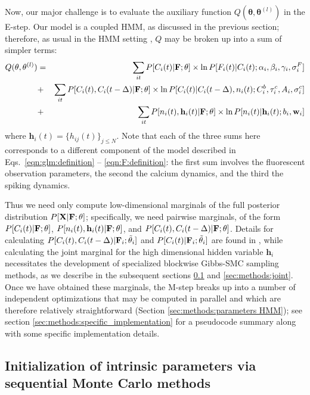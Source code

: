 \documentclass[aoas,preprint]{imsart}
\newcommand{\bth}{\mathbf{\theta}}
\newcommand{\w}{w}
\newcommand{\bw}{\mathbf{\w}}
\newcommand{\bF}{{\bf F}}
\newcommand{\bX}{{\bf X}}
\newcommand{\bh}{\mathbf{h}}
\newcommand{\tbth}{\tilde{\bth}}
\begin{document}
Now, our major challenge is to evaluate the auxiliary function $Q(\bth,\bth^{(l)})$ in the E-step. Our model is a coupled HMM, as discussed in the previous section; therefore, as usual in the HMM setting \cite{RAB89}, $Q$ may be broken up into a sum of simpler terms:
\begin{eqnarray}
Q(\bth,\bth^{(l)}) &=& \sum_{it} P[C_i(t) | \bF; \bth] \times \ln
P[F_i(t)|C_i(t); \alpha_i, \beta_i, \gamma_i, \sigma^F_i] \nonumber \\
&+& \sum_{it} P[C_i(t), C_i(t-\Delta) | \bF; \bth] \times \ln
P[C_i(t)|C_i(t-\Delta), n_i(t); C^b_i, \tau^c_i, A_i, \sigma^c_i]
\nonumber \\ &+& \sum_{it} P[n_i(t), \bh_i(t) | \bF; \bth] \times \ln
P[n_i(t)| \bh_i(t); b_i, \bw_i]
\label{eqn:loglik:definition-expl}
\end{eqnarray}
\noindent where $\bh_i(t)=\{h_{ij}(t)\}_{j \leq N}$. Note that each of
the three sums here corresponds to a different component of the model
described in Eqs.~\eqref{eqn:glm:definition} --
\eqref{eqn:F:definition}: the first sum involves the fluorescent
observation parameters, the second the calcium dynamics, and the third
the spiking dynamics.

Thus we need only compute low-dimensional marginals of the full
posterior distribution $P[\bX | \bF; \bth]$; specifically, we need
pairwise marginals, of the form $P[C_i(t)| \bF; \bth]$,
$P[n_i(t),\bh_i(t) | \bF; \bth]$, and $P[C_i(t), C_i(t- \Delta) | \bF;
\bth]$.  Details for calculating $P[C_i(t), C_i(t- \Delta) | \bF_i;
\tbth_i]$ and $P[C_i(t)|\bF_i;\tbth_i]$ are found in
\cite{Vogelstein2009}, while calculating the joint marginal for the
high dimensional hidden variable $\bh_i$ necessitates the development
of specialized blockwise Gibbs-SMC sampling methods, as we describe in
the subsequent sections \ref{sec:methods:indep} and
\ref{sec:methods:joint}. Once we have obtained these marginals, the
M-step breaks up into a number of independent optimizations that may
be computed in parallel and which are therefore relatively
straightforward (Section \ref{sec:methods:parameters HMM}); see
section \ref{sec:methods:specific_implementation} for a pseudocode
summary along with some specific implementation details.

\subsection{Initialization of intrinsic parameters via sequential
  Monte Carlo methods} \label{sec:methods:indep}
\end{document}
